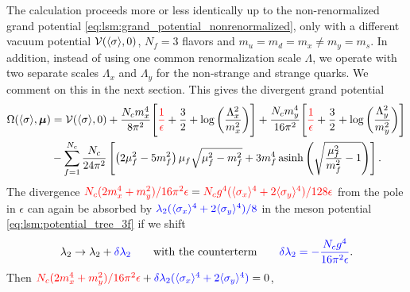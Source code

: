 The calculation proceeds more or less identically up to the non-renormalized grand potential \eqref{eq:lsm:grand_potential_nonrenormalized},
only with a different vacuum potential $\mathcal{V}(\langle \sigma \rangle,0)$, $N_f=3$ flavors and $m_u = m_d = m_x \neq m_y = m_s$.
In addition, instead of using one common renormalization scale $\Lambda$,
we operate with two separate scales $\Lambda_x$ and $\Lambda_y$ for the non-strange and strange quarks.
We comment on this in the next section.
This gives the divergent grand potential
\begin{equation}
\begin{split}
	\Omega(\avg{\sigma},\vec{\mu}) &= \pot(\avg{\sigma},0) + \frac{N_c m_x^4}{8 \pi^2} \Bigg[ \textcolor{red}{\frac{1}{\epsilon}} + \frac{3}{2} + \log\bigg(\frac{\Lambda_x^2}{m_x^2}\bigg) \Bigg] + \frac{N_c m_y^4}{16 \pi^2} \Bigg[ \textcolor{red}{\frac{1}{\epsilon}} + \frac{3}{2} + \log\bigg(\frac{\Lambda_y^2}{m_y^2}\bigg) \Bigg] \\ %
	                               &-\smashoperator{\sum_{f=1}^{N_c}} \frac{N_c}{24 \pi^2} \left[ \left( 2 \mu_f^2 - 5 m_f^2 \right) \mu_f \sqrt{\mu_f^2 - m_f^2} + 3 m_f^4 \asinh \left( \sqrt{\frac{\mu_{\smash{f}}^2}{m_f^2}-1} \right) \right]. \\
\end{split}
\end{equation}
The divergence $\textcolor{red}{N_c (2 m_x^4 + m_y^2) / 16 \pi^2 \epsilon} = \textcolor{red}{N_c g^4 (\langle \sigma_x \rangle^4 + 2\langle \sigma_y \rangle^4) / 128 \epsilon}$
from the pole in $\epsilon$
can again be absorbed by $\textcolor{blue}{\lambda_2 (\langle \sigma_x \rangle^4+2\langle \sigma_y \rangle^4)/8}$ 
in the meson potential \eqref{eq:lsm:potential_tree_3f} if we shift
\begin{equation}
	\lambda_2 \rightarrow \lambda_2 + \textcolor{blue}{\delta\lambda_2} \qquad \text{with the counterterm} \qquad \textcolor{blue}{\delta\lambda_2 = -\frac{N_c g^4}{16 \pi^2 \epsilon}}.
\end{equation}
Then $\textcolor{red}{N_c (2 m_x^4 + m_y^2) / 16 \pi^2 \epsilon} + \textcolor{blue}{\delta\lambda_2 (\langle \sigma_x \rangle^4+2\langle \sigma_y \rangle^4)} = 0$,
